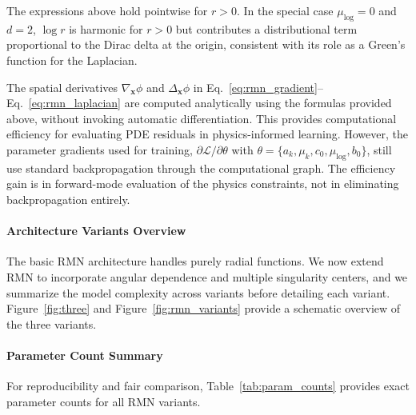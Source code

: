 \documentclass[twoside,11pt]{article}
\newcommand{\bx}{\bm{x}}
\renewcommand{\eqref}[1]{Eq.~\ref{#1}}
\begin{document}
The expressions above hold pointwise for $r>0$. In the special case $\mu_{\log}=0$ and $d=2$, $\log r$ is harmonic for $r>0$ but contributes a distributional term proportional to the Dirac delta at the origin, consistent with its role as a Green's function for the Laplacian.

\begin{remark}
	\label{rem:closed_form_clarification}
	The spatial derivatives $\nabla_{\bx} \phi$ and $\Delta_{\bx} \phi$ in \eqref{eq:rmn_gradient}--\eqref{eq:rmn_laplacian} are computed analytically using the formulas provided above, without invoking automatic differentiation. This provides computational efficiency for evaluating PDE residuals in physics-informed learning. However, the parameter gradients used for training, $\partial \mathcal{L}/\partial \theta$ with $\theta = \{a_k, \mu_k, c_0, \mu_{\log}, b_0\}$, still use standard backpropagation through the computational graph. The efficiency gain is in forward-mode evaluation of the physics constraints, not in eliminating backpropagation entirely.
\end{remark}

\paragraph{Architecture Variants Overview}

The basic RMN architecture handles purely radial functions. We now extend RMN to incorporate angular dependence and multiple singularity centers, and we summarize the model complexity across variants before detailing each variant. Figure~\ref{fig:three} and Figure~\ref{fig:rmn_variants} provide a schematic overview of the three variants.

\paragraph{Parameter Count Summary}
\label{par:param_count}

For reproducibility and fair comparison, Table~\ref{tab:param_counts} provides exact parameter counts for all RMN variants.
\end{document}
